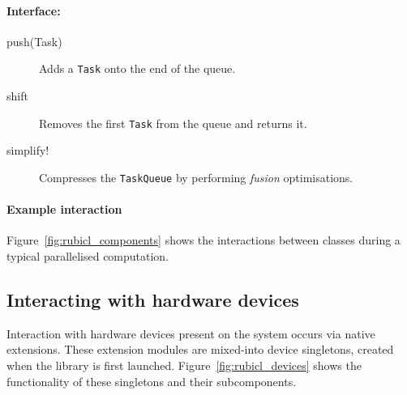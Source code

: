 \begin{description}
\paragraph*{Interface:}
\begin{description}
  \item[push(Task)] Adds a \verb|Task| onto the end of the queue.

\item[shift] Removes the first \verb|Task| from the queue and returns it.

\item[simplify!] Compresses the \verb|TaskQueue| by performing \emph{fusion} optimisations.
\end{description}


\end{description}


\paragraph*{Example interaction} Figure~\ref{fig:rubicl_components} shows the interactions between classes during a typical parallelised computation.

\subsection{Interacting with hardware devices}
Interaction with hardware devices present on the system occurs via native extensions. These extension modules are mixed-into device singletons, created when the library is first launched. Figure~\ref{fig:rubicl_devices} shows the functionality of these singletons and their subcomponents.


